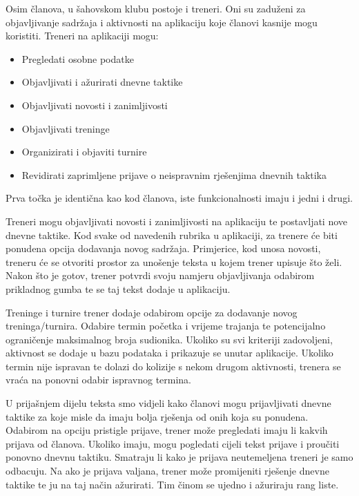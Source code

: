 \documentclass{article}
\begin{document}
		
		Osim članova, u šahovskom klubu postoje i treneri. Oni su zaduženi za objavljivanje sadržaja i aktivnosti na aplikaciju koje članovi kasnije mogu koristiti. Treneri na aplikaciji mogu:
		
		\begin{itemize}
			\item Pregledati osobne podatke 
			\item Objavljivati i ažurirati dnevne taktike 
			\item Objavljivati novosti i zanimljivosti 
			\item Objavljivati treninge 
			\item Organizirati i objaviti turnire 
			\item Revidirati zaprimljene prijave o neispravnim rješenjima dnevnih taktika 
		\end{itemize} 
		
		Prva točka je identična kao kod članova, iste funkcionalnosti imaju i jedni i drugi. 
		
		Treneri mogu objavljivati novosti i zanimljivosti na aplikaciju te postavljati nove dnevne taktike. Kod svake od navedenih rubrika u aplikaciji, za trenere će biti ponudena opcija dodavanja novog sadržaja. Primjerice, kod unosa novosti, treneru će se otvoriti prostor za unošenje teksta u kojem trener upisuje što želi. Nakon što je gotov, trener potvrdi svoju namjeru objavljivanja odabirom prikladnog gumba te se taj tekst dodaje u aplikaciju. 
		
		Treninge i turnire trener dodaje odabirom opcije za dodavanje novog treninga/turnira. Odabire termin početka i vrijeme trajanja te potencijalno ograničenje maksimalnog broja sudionika. Ukoliko su svi kriteriji zadovoljeni, aktivnost se dodaje u bazu podataka i prikazuje se unutar aplikacije. Ukoliko termin nije ispravan te dolazi do kolizije s nekom drugom aktivnosti, trenera se vraća na ponovni odabir ispravnog termina. 
		
		U prijašnjem dijelu teksta smo vidjeli kako članovi mogu prijavljivati dnevne taktike za koje misle da imaju bolja rješenja od onih koja su ponudena. Odabirom na opciju pristigle prijave, trener može pregledati imaju li kakvih prijava od članova. Ukoliko imaju, mogu pogledati cijeli tekst prijave i proučiti ponovno dnevnu taktiku. Smatraju li kako je prijava neutemeljena treneri je samo odbacuju. Na ako je prijava valjana, trener može promijeniti rješenje dnevne taktike te ju na taj način ažurirati. Tim činom se ujedno i ažuriraju rang liste.\\ 
		
\end{document}
